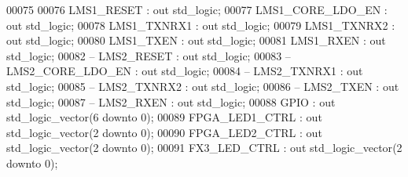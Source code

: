 \begin{DoxyCode}
00075         
00076         \textcolor{vhdlchar}{LMS1_RESET}          \textcolor{vhdlchar}{:} \textcolor{keywordflow}{out} \textcolor{comment}{std\_logic};
00077         \textcolor{vhdlchar}{LMS1_CORE_LDO_EN}    \textcolor{vhdlchar}{:} \textcolor{keywordflow}{out} \textcolor{comment}{std\_logic};
00078         \textcolor{vhdlchar}{LMS1_TXNRX1}         \textcolor{vhdlchar}{:} \textcolor{keywordflow}{out} \textcolor{comment}{std\_logic};
00079         \textcolor{vhdlchar}{LMS1_TXNRX2}         \textcolor{vhdlchar}{:} \textcolor{keywordflow}{out} \textcolor{comment}{std\_logic};
00080         \textcolor{vhdlchar}{LMS1_TXEN}           \textcolor{vhdlchar}{:} \textcolor{keywordflow}{out} \textcolor{comment}{std\_logic};
00081         \textcolor{vhdlchar}{LMS1_RXEN}           \textcolor{vhdlchar}{:} \textcolor{keywordflow}{out} \textcolor{comment}{std\_logic};
00082 \textcolor{keyword}{--      LMS2\_RESET          : out std\_logic;}
00083 \textcolor{keyword}{--      LMS2\_CORE\_LDO\_EN    : out std\_logic;}
00084 \textcolor{keyword}{--      LMS2\_TXNRX1         : out std\_logic;}
00085 \textcolor{keyword}{--      LMS2\_TXNRX2         : out std\_logic;}
00086 \textcolor{keyword}{--      LMS2\_TXEN           : out std\_logic;}
00087 \textcolor{keyword}{--      LMS2\_RXEN           : out std\_logic;}
00088         \textcolor{vhdlchar}{GPIO}                    \textcolor{vhdlchar}{:} \textcolor{keywordflow}{out} \textcolor{comment}{std\_logic\_vector}\textcolor{vhdlchar}{(}\textcolor{vhdllogic}{}\textcolor{vhdllogic}{6} \textcolor{keywordflow}{downto} \textcolor{vhdllogic}{}\textcolor{vhdllogic}{0}\textcolor{vhdlchar}{)};
00089         \textcolor{vhdlchar}{FPGA_LED1_CTRL}      \textcolor{vhdlchar}{:} \textcolor{keywordflow}{out} \textcolor{comment}{std\_logic\_vector}\textcolor{vhdlchar}{(}\textcolor{vhdllogic}{}\textcolor{vhdllogic}{2} \textcolor{keywordflow}{downto} \textcolor{vhdllogic}{}\textcolor{vhdllogic}{0}\textcolor{vhdlchar}{)};
00090         \textcolor{vhdlchar}{FPGA_LED2_CTRL}      \textcolor{vhdlchar}{:} \textcolor{keywordflow}{out} \textcolor{comment}{std\_logic\_vector}\textcolor{vhdlchar}{(}\textcolor{vhdllogic}{}\textcolor{vhdllogic}{2} \textcolor{keywordflow}{downto} \textcolor{vhdllogic}{}\textcolor{vhdllogic}{0}\textcolor{vhdlchar}{)};
00091         \textcolor{vhdlchar}{FX3_LED_CTRL}        \textcolor{vhdlchar}{:} \textcolor{keywordflow}{out} \textcolor{comment}{std\_logic\_vector}\textcolor{vhdlchar}{(}\textcolor{vhdllogic}{}\textcolor{vhdllogic}{2} \textcolor{keywordflow}{downto} \textcolor{vhdllogic}{}\textcolor{vhdllogic}{0}\textcolor{vhdlchar}{)};

\end{DoxyCode}
